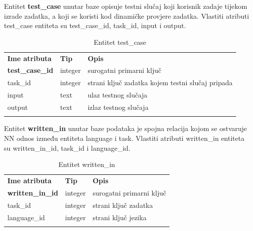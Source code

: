 \documentclass[times, utf8, zavrsni]{fer}
\begin{document}
		Entitet \textbf{test\_case} unutar baze opisuje testni slučaj koji korisnik zadaje tijekom izrade zadatka, a koji se koristi kod dinamičke provjere zadatka. Vlastiti atributi test\_case entiteta su test\_case\_id, task\_id, input i output. 
		\begin{table}[H]
			\caption{Entitet test\_case}
			\label{tbl:testcase}
			\centering
			\begin{tabu} to \textwidth {XXX}
				\tabucline[1.75pt]{-}
				\textbf{Ime atributa} & \textbf{Tip} & \textbf{Opis}\\ 				
				\tabucline[1.75pt]{-}
				\textbf{test\_case\_id} & integer & surogatni primarni ključ\\ \hline
				task\_id & integer & strani ključ zadatka kojem testni slučaj pripada\\ \hline
				input & text & ulaz testnog slučaja\\ \hline
				output & text & izlaz testnog slučaja\\ \hline
				\tabucline[1.75pt]{-}
			\end{tabu}
		\end{table}
		
		Entitet \textbf{written\_in} unutar baze podataka je spojna relacija kojom se ostvaruje NN odnos između entiteta language i task. Vlastiti atributi written\_in entiteta su written\_in\_id, task\_id i language\_id. 
		\begin{table}[H]
			\caption{Entitet written\_in}
			\label{tbl:writtenin}
			\centering
			\begin{tabu} to \textwidth {XXX}
				\tabucline[1.75pt]{-}
				\textbf{Ime atributa} & \textbf{Tip} & \textbf{Opis}\\ 				
				\tabucline[1.75pt]{-}
				\textbf{written\_in\_id} & integer & surogatni primarni ključ\\ \hline
				task\_id & integer & strani ključ zadatka\\ \hline
				language\_id & integer & strani ključ jezika\\ \hline
				\tabucline[1.75pt]{-}
			\end{tabu}
		\end{table}
		
\end{document}
